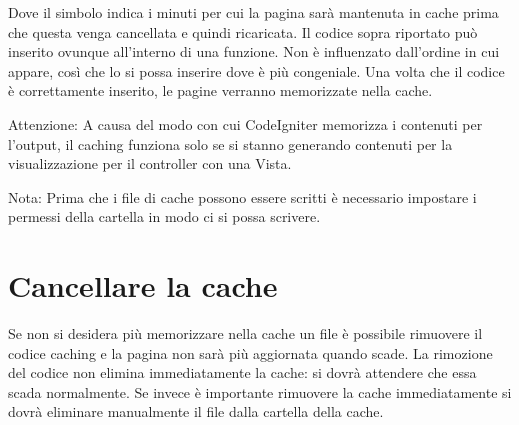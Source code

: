 
Dove il simbolo  indica i minuti per cui la pagina sarà mantenuta in cache prima che questa venga cancellata e quindi ricaricata. Il codice sopra riportato può inserito ovunque all'interno di una funzione. Non è influenzato dall'ordine in cui appare, così che lo si possa inserire dove è più congeniale. Una volta che il codice è  correttamente inserito, le pagine verranno memorizzate nella cache.

Attenzione: A causa del modo con cui CodeIgniter memorizza i contenuti per l'output, il caching funziona solo se si stanno generando contenuti per la visualizzazione per il controller con una Vista. 

Nota: Prima che i file di cache possono essere scritti è necessario impostare i permessi della cartella  in modo ci si possa scrivere.

\section*{Cancellare la cache}
Se non si desidera più memorizzare nella cache un file è possibile rimuovere il codice caching e la pagina non sarà più aggiornata quando scade. La rimozione del codice non elimina immediatamente la cache: si dovrà attendere che essa scada normalmente. Se invece è importante rimuovere la cache immediatamente si dovrà eliminare manualmente il file dalla cartella della cache.